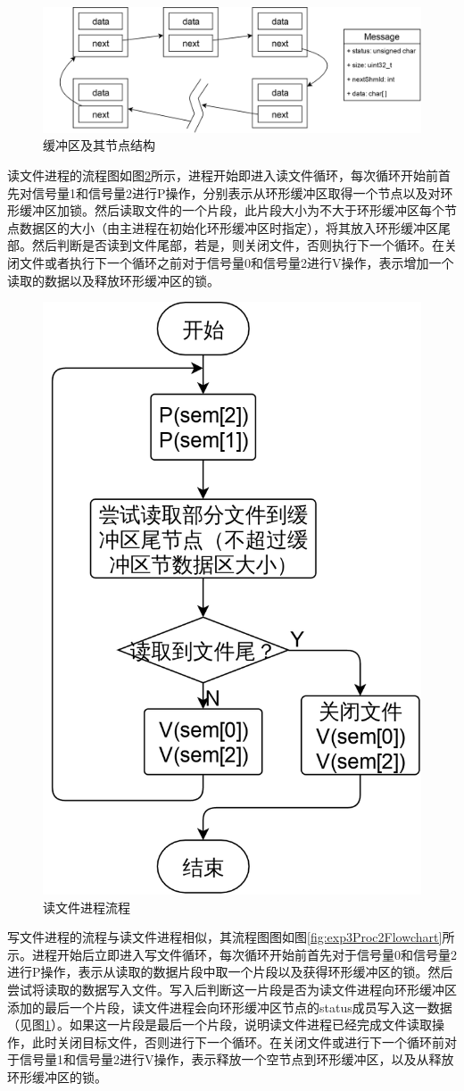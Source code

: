 \documentclass{report}
\begin{document}
\begin{figure}[ht]
    \centering
    \includegraphics[width=0.7\linewidth]{exp3DataStructure.png}
    \caption{缓冲区及其节点结构}
    \label{fig:exp3DataStructure}
\end{figure}

读文件进程的流程图如图\ref{fig:exp3Proc1Flowchart}所示，进程开始即进入读文件循环，每次循环开始前首先对信号量1和信号量2进行P操作，分别表示从环形缓冲区取得一个节点以及对环形缓冲区加锁。然后读取文件的一个片段，此片段大小为不大于环形缓冲区每个节点数据区的大小（由主进程在初始化环形缓冲区时指定），将其放入环形缓冲区尾部。然后判断是否读到文件尾部，若是，则关闭文件，否则执行下一个循环。在关闭文件或者执行下一个循环之前对于信号量0和信号量2进行V操作，表示增加一个读取的数据以及释放环形缓冲区的锁。
\begin{figure}[H]
    \centering
    \includegraphics[width=0.3\linewidth]{exp3Proc1Flowchart.png}
    \caption{读文件进程流程}
    \label{fig:exp3Proc1Flowchart}
\end{figure}

写文件进程的流程与读文件进程相似，其流程图图如图\ref{fig:exp3Proc2Flowchart}所示。进程开始后立即进入写文件循环，每次循环开始前首先对于信号量0和信号量2进行P操作，表示从读取的数据片段中取一个片段以及获得环形缓冲区的锁。然后尝试将读取的数据写入文件。写入后判断这一片段是否为读文件进程向环形缓冲区添加的最后一个片段，读文件进程会向环形缓冲区节点的status成员写入这一数据（见图\ref{fig:exp3DataStructure}）。如果这一片段是最后一个片段，说明读文件进程已经完成文件读取操作，此时关闭目标文件，否则进行下一个循环。在关闭文件或进行下一个循环前对于信号量1和信号量2进行V操作，表示释放一个空节点到环形缓冲区，以及从释放环形缓冲区的锁。
\end{document}
